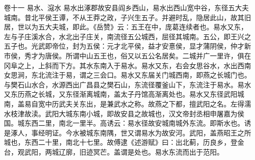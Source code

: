 \documentclass[12pt,UTF8]{ctexbook}
\begin{document}
卷十一  易水、滱水
易水出涿郡故安县阎乡西山，易水出西山宽中谷，东径五大夫城南。昔北平侯王谭，不从王莽之政，子兴生五子。并避时乱，隐居此山，故其旧居，世以为五大夫城，即此。《岳赞》云：五王在中，庞葛连续者也。易水又东，左与子庄溪水合，水北出子庄关，南流径五公城西，屈径其城南。五公，即王兴之五子也。光武即帝位，封为五侯：元才北平侯，益才安憙侯，显才蒲阴侯，仲才新市侯，秀才为唐侯。所谓中山五王也，俗又以五公名居矣。二城并广一里许，俱在冈阜之上，上斜而下方。其水东南入于易水。易水又东，右会女思谷水，水出西南女思涧，东北流注于易，谓之三会口。易水又东届关门城西南，即燕之长城门也。与樊石山水合，水源西出广昌县之樊石山，东流径覆釜山下，东流注于易水。易水又东历燕之长城，又东径渐离城南，盖太子丹馆高渐离处也。易水又东径武阳城南，盖易自宽中历武夫关东出，是兼武水之称。故燕之下都，擅武阳之名。左得濡水枝津故渎。武阳大城东南小城，即故安县之故城也，汉文帝封丞相申屠嘉为侯国。城东西二里，南北一里半。高诱云：易水径故安城南城外东流。即斯水也。诱是涿人，事经明证。今水被城东南隅，世又谓易水为故安河。武阳，盖燕昭王之所城也，东西二十里，南北十七里。故傅逮《述游赋》曰：出北蓟，历良乡，登金台，观武阳，两城辽廓，旧迹冥芒。盖谓是处也。易水东流而出于范阳。
\end{document}
